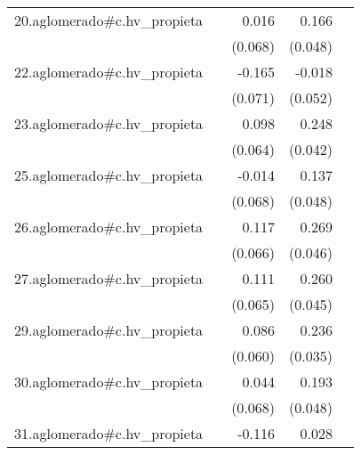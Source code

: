 {\begin{longtable}{l*{4}{D{.}{.}{-1}}}
\addlinespace
20.aglomerado#c.hv\_propieta&                     &       0.016         &       0.166\sym{***}&                     \\
            &                     &     (0.068)         &     (0.048)         &                     \\
\addlinespace
22.aglomerado#c.hv\_propieta&                     &      -0.165\sym{*}  &      -0.018         &                     \\
            &                     &     (0.071)         &     (0.052)         &                     \\
\addlinespace
23.aglomerado#c.hv\_propieta&                     &       0.098         &       0.248\sym{***}&                     \\
            &                     &     (0.064)         &     (0.042)         &                     \\
\addlinespace
25.aglomerado#c.hv\_propieta&                     &      -0.014         &       0.137\sym{**} &                     \\
            &                     &     (0.068)         &     (0.048)         &                     \\
\addlinespace
26.aglomerado#c.hv\_propieta&                     &       0.117         &       0.269\sym{***}&                     \\
            &                     &     (0.066)         &     (0.046)         &                     \\
\addlinespace
27.aglomerado#c.hv\_propieta&                     &       0.111         &       0.260\sym{***}&                     \\
            &                     &     (0.065)         &     (0.045)         &                     \\
\addlinespace
29.aglomerado#c.hv\_propieta&                     &       0.086         &       0.236\sym{***}&                     \\
            &                     &     (0.060)         &     (0.035)         &                     \\
\addlinespace
30.aglomerado#c.hv\_propieta&                     &       0.044         &       0.193\sym{***}&                     \\
            &                     &     (0.068)         &     (0.048)         &                     \\
\addlinespace
31.aglomerado#c.hv\_propieta&                     &      -0.116         &       0.028         &                     \\

\end{longtable}}
